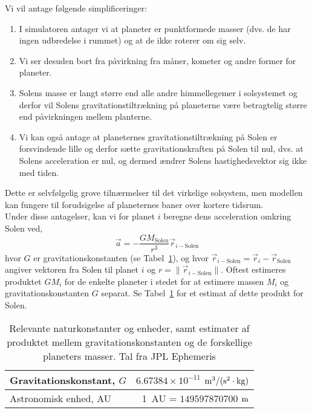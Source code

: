 \documentclass{article}
\begin{document}
\begin{enumerate}[label=11g.\arabic*,start=0]
Vi vil antage følgende simplificeringer: 
\begin{enumerate}
\item I simulatoren antager vi at planeter er punktformede masser (dvs. de har ingen udbredelse i rummet) og at de ikke roterer om sig selv.
\item Vi ser desuden bort fra påvirkning fra måner, kometer og andre former for planeter.
\item Solens masse er langt større end alle andre himmellegemer i solsystemet og derfor vil Solens gravitationstiltrækning på planeterne være betragtelig større end påvirkningen mellem planterne.
\item Vi kan også antage at planeternes gravitationstiltrækning på Solen er forsvindende lille og derfor sætte gravitationskraften på Solen til nul, dvs. at Solens acceleration er nul, og dermed ændrer Solens hastighedsvektor sig ikke med tiden.
\end{enumerate}
Dette er selvfølgelig grove tilnærmelser til det virkelige solsystem, men modellen kan fungere til forudsigelse af planeternes baner over kortere tidsrum.\\
Under disse antagelser, kan vi for planet $i$ beregne dens acceleration omkring Solen ved,
\begin{equation}
  \label{eq:2-gravitationalacceleration}
  \vec{a} = - \frac{G M_{\mathrm{Solen}} }{r^3} \vec{r}_{i-\mathrm{Solen}} 
\end{equation}
hvor $G$ er gravitationskonstanten (se Tabel~\ref{tab:constants}), og hvor $\vec{r}_{i-\mathrm{Solen}} = \vec{r}_{i} - \vec{r}_{\mathrm{Solen}}$ angiver vektoren fra Solen til planet $i$ og $r = \| \vec{r}_{i-\mathrm{Solen}}\|$.  Oftest estimeres produktet $G M_i$ for de enkelte planeter i stedet for at estimere massen $M_i$ og gravitationskonstanten $G$ separat. Se Tabel~\ref{tab:constants} for et estimat af dette produkt for Solen.
\begin{table}
  \caption{Relevante naturkonstanter og enheder, samt estimater af produktet mellem gravitationskonstanten og de forskellige planeters masser. Tal fra JPL Ephemeris \cite{JPL}} \label{tab:constants}
  \begin{center}
    \begin{tabular}{|l|r|}
      \hline
      Gravitationskonstant, $G$ & $6.67384 \times 10^{-11}$ $\meter^3 / (\second^2 \cdot \mass)$ \\ \hline
      Astronomisk enhed, AU & 1~AU = $149597870700$ $\meter$ \\ \hline

\end{tabular}
\end{center}
\end{table}
\end{enumerate}
\end{document}
